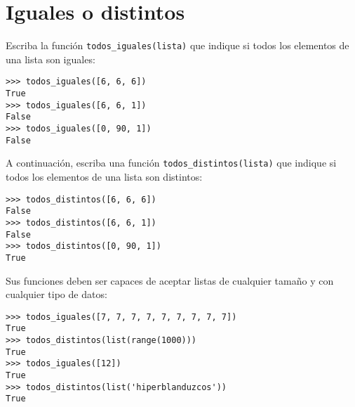 \section{Iguales o distintos}

Escriba la función \lstinline!todos_iguales(lista)! que indique si todos
los elementos de una lista son iguales:

\begin{lstlisting}
>>> todos_iguales([6, 6, 6])
True
>>> todos_iguales([6, 6, 1])
False
>>> todos_iguales([0, 90, 1])
False
\end{lstlisting}

A continuación, escriba una función \lstinline!todos_distintos(lista)!
que indique si todos los elementos de una lista son distintos:

\begin{lstlisting}
>>> todos_distintos([6, 6, 6])
False
>>> todos_distintos([6, 6, 1])
False
>>> todos_distintos([0, 90, 1])
True
\end{lstlisting}

Sus funciones deben ser capaces de aceptar listas de cualquier tamaño y
con cualquier tipo de datos:

\begin{lstlisting}
>>> todos_iguales([7, 7, 7, 7, 7, 7, 7, 7, 7])
True
>>> todos_distintos(list(range(1000)))
True
>>> todos_iguales([12])
True
>>> todos_distintos(list('hiperblanduzcos'))
True
\end{lstlisting}

